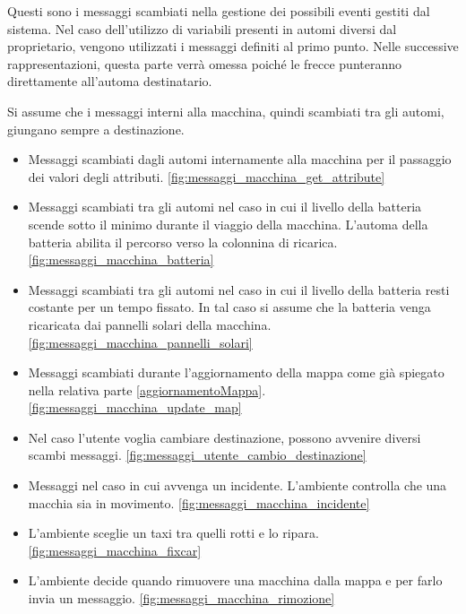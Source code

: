 Questi sono i messaggi scambiati nella gestione dei possibili eventi gestiti dal sistema. Nel caso dell'utilizzo di variabili presenti in automi diversi dal proprietario, vengono utilizzati i messaggi definiti al primo punto. Nelle successive rappresentazioni, questa parte verrà omessa poiché le frecce punteranno direttamente all'automa destinatario.

Si assume che i messaggi interni alla macchina, quindi scambiati tra gli automi, giungano sempre a destinazione.

\begin{itemize}
	\item Messaggi scambiati dagli automi internamente alla macchina per il passaggio dei valori degli attributi. \ref{fig:messaggi_macchina_get_attribute}
	\item Messaggi scambiati tra gli automi nel caso in cui il livello della batteria scende sotto il minimo durante il viaggio della macchina. L'automa della batteria abilita il percorso verso la colonnina di ricarica. \ref{fig:messaggi_macchina_batteria}
	\item Messaggi scambiati tra gli automi nel caso in cui il livello della batteria resti costante per un tempo fissato. In tal caso si assume che la batteria venga ricaricata dai pannelli solari della macchina. \ref{fig:messaggi_macchina_pannelli_solari}
	\item Messaggi scambiati durante l'aggiornamento della mappa come già spiegato nella relativa parte \ref{aggiornamentoMappa}. \ref{fig:messaggi_macchina_update_map}
	\item Nel caso l'utente voglia cambiare destinazione, possono avvenire diversi scambi messaggi. \ref{fig:messaggi_utente_cambio_destinazione}
	\item Messaggi nel caso in cui avvenga un incidente. L'ambiente controlla che una macchia sia in movimento. \ref{fig:messaggi_macchina_incidente}
	\item L'ambiente sceglie un taxi tra quelli rotti e lo ripara. \ref{fig:messaggi_macchina_fixcar}
	\item L'ambiente decide quando rimuovere una macchina dalla mappa e per farlo invia un messaggio. \ref{fig:messaggi_macchina_rimozione}
\end{itemize}

\newpage

